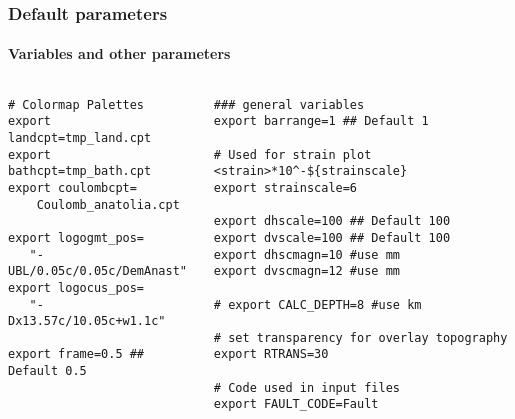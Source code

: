\begin{frame}[t,fragile]
  \frametitle{Default parameters}
  \framesubtitle{Variables and other parameters}
  \label{ch3fr:defvarpar}
\begin{columns}[t]
  \begin{column}{.45\textwidth}
\begin{scriptsize}
	\begin{verbatim}
# Colormap Palettes
export landcpt=tmp_land.cpt
export bathcpt=tmp_bath.cpt
export coulombcpt=
    Coulomb_anatolia.cpt

export logogmt_pos=
   "-UBL/0.05c/0.05c/DemAnast"
export logocus_pos=
   "-Dx13.57c/10.05c+w1.1c"

export frame=0.5 ## Default 0.5
\end{verbatim}
	\end{scriptsize}
  \end{column}
  \begin{column}{.54\textwidth}
\begin{scriptsize}
	\begin{verbatim}
### general variables
export barrange=1 ## Default 1

# Used for strain plot <strain>*10^-${strainscale}
export strainscale=6

export dhscale=100 ## Default 100
export dvscale=100 ## Default 100
export dhscmagn=10 #use mm
export dvscmagn=12 #use mm

# export CALC_DEPTH=8 #use km

# set transparency for overlay topography
export RTRANS=30

# Code used in input files
export FAULT_CODE=Fault

\end{verbatim}	  
	\end{scriptsize}
  \end{column}
\end{columns}
\end{frame}
\note{} %




















